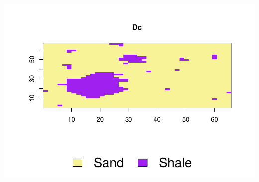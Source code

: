 \documentclass[
]{article}
\begin{document}
\includegraphics{Ex3_files/figure-latex/unnamed-chunk-7-1.pdf}
\end{document}
